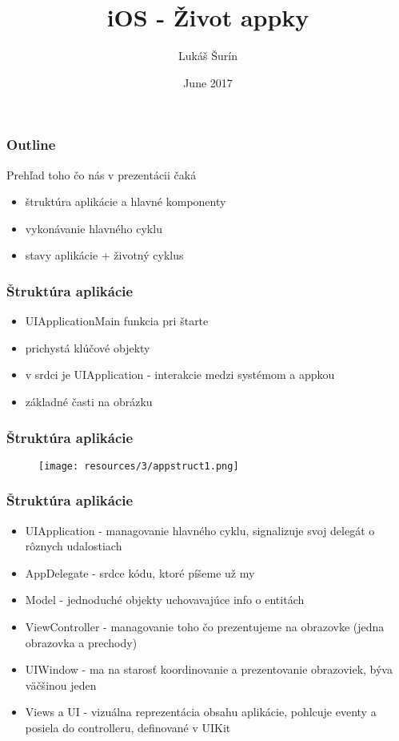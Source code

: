 \documentclass[serif,mathserif]{beamer}
\author[Lukáš Šurín]{Lukáš Šurín}
\title[Život appky\hspace{2em}\insertframenumber/\inserttotalframenumber]{iOS - Život appky }
\date{June 2017}
\institute{Profinit}
\begin{document}
\maketitle


\begin{frame}
  \frametitle{Outline}
  Prehľad toho čo nás v prezentácii čaká\pause
  \begin{itemize}
  \item štruktúra aplikácie a hlavné komponenty\pause
  \item vykonávanie hlavného cyklu\pause
  \item stavy aplikácie + životný cyklus\pause
  \end{itemize}
\end{frame}

\begin{frame}
  \frametitle{Štruktúra aplikácie}
  \begin{itemize}
  \item UIApplicationMain funkcia pri štarte\pause
  \item prichystá klúčové objekty\pause
  \item v srdci je UIApplication - interakcie medzi systémom a appkou \pause
  \item základné časti na obrázku   
  \end{itemize}
\end{frame}

\begin{frame}
  \frametitle{Štruktúra aplikácie}
 \begin{figure}[h]
	\texttt{[image: resources/3/appstruct1.png]}
  \end{figure}
\end{frame}

\begin{frame}
  \frametitle{Štruktúra aplikácie}
  \begin{itemize}
  \item UIApplication - managovanie hlavného cyklu, signalizuje svoj delegát o rôznych udalostiach\pause
  \item AppDelegate - srdce kódu, ktoré píšeme už my \pause
  \item Model - jednoduché objekty uchovavajúce info o entitách \pause
  \item ViewController - managovanie toho čo prezentujeme na obrazovke (jedna obrazovka a prechody) \pause
    \item UIWindow - ma na starosť koordinovanie a prezentovanie obrazoviek, býva väčšinou jeden \pause
    \item Views a UI - vizuálna reprezentácia obsahu aplikácie, pohlcuje eventy a posiela do controlleru, definované v UIKit
  \end{itemize}
\end{frame}
\end{document}
